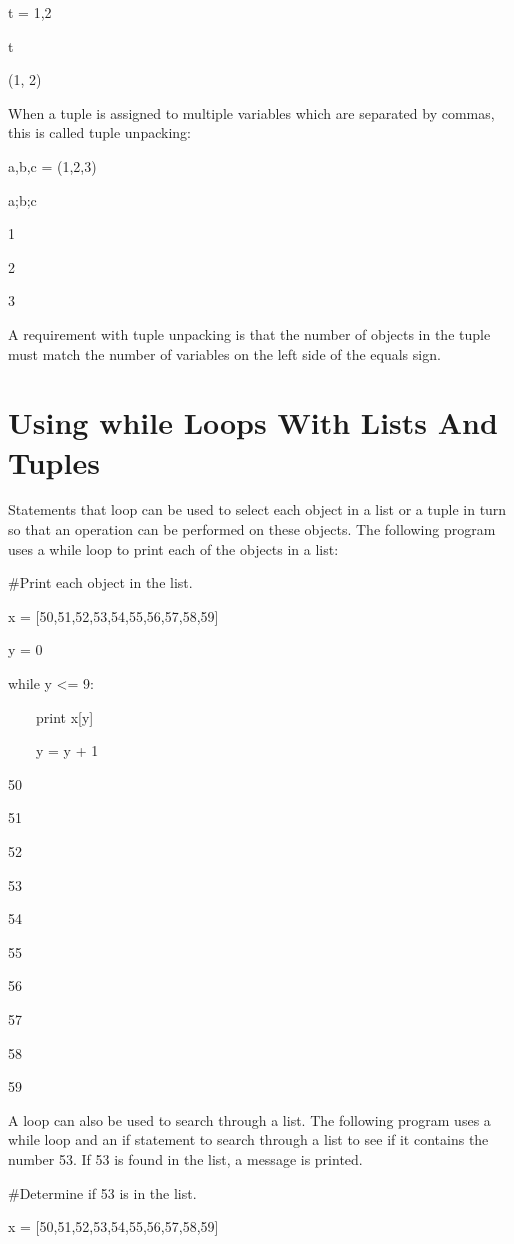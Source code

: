 \documentclass[12pt,oneside]{book}
\begin{document}
t = 1,2

t

{\textbar}

(1, 2)

When a tuple is assigned to multiple variables which are separated by commas, this is called tuple unpacking: 

a,b,c = (1,2,3)

a;b;c

{\textbar}

1

2

3

A requirement with tuple unpacking is that the number of objects in the tuple must match the number of variables on the left side of the equals sign.

\section[Using while Loops With Lists And Tuples]{Using while Loops With Lists And Tuples}

Statements that loop can be used to select each object in a list or a tuple in turn so that an operation can be performed on these objects. The following program uses a while loop to print each of the objects in a list: 

\#Print each object in the list.

x = [50,51,52,53,54,55,56,57,58,59]

y = 0

while y {\textless}= 9:

\ \ \ \ print x[y]

\ \ \ \ y = y + 1

{\textbar}

50

51

52

53

54

55

56

57

58

59


A loop can also be used to search through a list. The following program uses a while loop and an if statement to search through a list to see if it contains the number 53. If 53 is found in the list, a message is printed. 

\#Determine if 53 is in the list.

x = [50,51,52,53,54,55,56,57,58,59]
\end{document}
